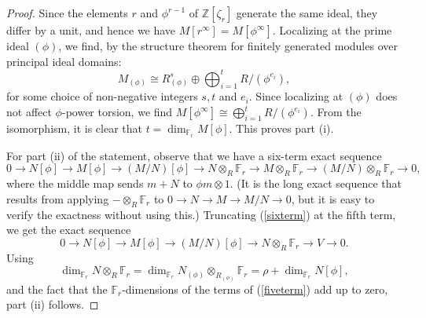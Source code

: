 \documentclass[reqno]{amsart}
\theoremstyle{definition}
\theoremstyle{remark}
\def\Z{\mathbb{Z}}
\def\F{\mathbb{F}}
\begin{document}
\begin{proof}
Since the elements $r$ and $\phi^{r-1}$ of $\Z[\zeta_r]$ generate the same ideal, they differ by a unit, and hence we have $M[r^\infty] = M[\phi^\infty]$. Localizing at the prime ideal $(\phi)$, we find, by the structure theorem for finitely generated modules over principal ideal domains:
$$
M_{(\phi)} \cong R_{(\phi)}^s \oplus \bigoplus_{i=1}^{t} R/(\phi^{e_i}),
$$
for some choice of non-negative integers $s,t$ and $e_i$. Since localizing at $(\phi)$ does not affect $\phi$-power torsion, we find $M[\phi^\infty] \cong \bigoplus_{i=1}^{t} R/(\phi^{e_i})$. From the isomorphism, it is clear that $t = \dim_{\F_r} M[\phi]$. This proves part (i).

For part (ii) of the statement, observe that we have a six-term exact sequence
\begin{equation}
\label{sixterm}
0 \rightarrow N[\phi] \rightarrow M[\phi] \rightarrow (M/N)[\phi] \rightarrow N\otimes_R \F_r \rightarrow M\otimes_R \F_r \rightarrow (M/N) \otimes_R \F_r \rightarrow 0,
\end{equation}
where the middle map sends $m + N$ to $\phi m \otimes 1$. (It is the long exact sequence that results from applying $- \otimes_R \F_r$ to $0 \rightarrow N \rightarrow M \rightarrow M/N \rightarrow 0$, but it is easy to verify the exactness without using this.) Truncating (\ref{sixterm}) at the fifth term, we get the exact sequence
 \begin{equation}
\label{fiveterm}
0 \rightarrow N[\phi] \rightarrow M[\phi] \rightarrow (M/N)[\phi] \rightarrow N\otimes_R \F_r \rightarrow V \rightarrow 0.
\end{equation}
Using
$$
\dim_{\F_r} N \otimes_R \F_r = \dim_{\F_r} N_{(\phi)} \otimes_{R_{(\phi)}} \F_r = \rho + \dim_{\F_r} N[\phi],
$$
and the fact that the $\F_r$-dimensions of the terms of (\ref{fiveterm}) add up to zero, part (ii) follows.
\end{proof}
\end{document}
